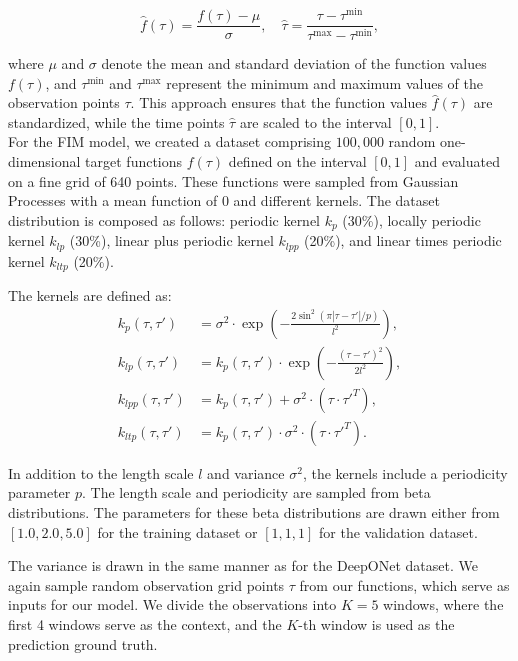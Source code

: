 \documentclass{article}
\theoremstyle{plain}
\theoremstyle{definition}
\theoremstyle{remark}
\begin{document}
\[
\hat{f}(\tau) = \frac{f(\tau) - \mu}{\sigma}, \quad \hat{\tau} = \frac{\tau - \tau^{\text{min}}}{\tau^{\text{max}} - \tau^{\text{min}}},
\]

where \(\mu\) and \(\sigma\) denote the mean and standard deviation of the function values \(f(\tau)\), and \(\tau^{\text{min}}\) and \(\tau^{\text{max}}\) represent the minimum and maximum values of the observation points \(\tau\). This approach ensures that the function values \(\hat{f}(\tau)\) are standardized, while the time points \(\hat{\tau}\) are scaled to the interval \([0, 1]\).
\\
For the FIM model, we created a dataset comprising \(100{,}000\) random one-dimensional target functions \(f(\tau)\) defined on the interval \([0, 1]\) and evaluated on a fine grid of 640 points. These functions were sampled from Gaussian Processes with a mean function of \(0\) and different kernels. The dataset distribution is composed as follows: periodic kernel \(k_p\) (30\%), locally periodic kernel \(k_{lp}\) (30\%), linear plus periodic kernel \(k_{lpp}\) (20\%), and linear times periodic kernel \(k_{ltp}\) (20\%).

The kernels are defined as:
\begin{align*}
    k_p(\tau, \tau') &= \sigma^2 \cdot \exp\left(-\frac{2\sin^2\left(\pi |\tau - \tau'| / p\right)}{l^2}\right), \\
    k_{lp}(\tau, \tau') &= k_p(\tau, \tau') \cdot \exp\left(-\frac{(\tau - \tau')^2}{2l^2}\right), \\
    k_{lpp}(\tau, \tau') &= k_p(\tau, \tau') + \sigma^2 \cdot (\tau \cdot \tau'^T), \\
    k_{ltp}(\tau, \tau') &= k_p(\tau, \tau') \cdot \sigma^2 \cdot (\tau \cdot \tau'^T).
\end{align*}

In addition to the length scale \(l\) and variance \(\sigma^2\), the kernels include a periodicity parameter \(p\). The length scale and periodicity are sampled from beta distributions. The parameters for these beta distributions are drawn either from \([1.0, 2.0, 5.0]\) for the training dataset or \([1, 1, 1]\) for the validation dataset.

The variance is drawn in the same manner as for the DeepONet dataset. We again sample random observation grid points \(\tau\) from our functions, which serve as inputs for our model. We divide the observations into \(K=5\) windows, where the first 4 windows serve as the context, and the \(K\)-th window is used as the prediction ground truth.
\end{document}
